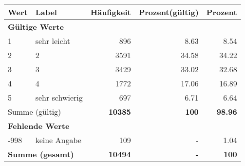     \begin{longtable}{lXrrr}
     \toprule
     \textbf{Wert} & \textbf{Label} & \textbf{Häufigkeit} & \textbf{Prozent(gültig)} & \textbf{Prozent} \\
     \endhead
     \midrule
     \multicolumn{5}{l}{\textbf{Gültige Werte}}\\

     1 &
     \multicolumn{1}{X}{ sehr leicht   } &


       \num{896} &
       \num[round-mode=places,round-precision=2]{8.63} &
         \num[round-mode=places,round-precision=2]{8.54} \\

     2 &
     \multicolumn{1}{X}{ 2   } &


       \num{3591} &
       \num[round-mode=places,round-precision=2]{34.58} &
         \num[round-mode=places,round-precision=2]{34.22} \\

     3 &
     \multicolumn{1}{X}{ 3   } &


       \num{3429} &
       \num[round-mode=places,round-precision=2]{33.02} &
         \num[round-mode=places,round-precision=2]{32.68} \\

     4 &
     \multicolumn{1}{X}{ 4   } &


       \num{1772} &
       \num[round-mode=places,round-precision=2]{17.06} &
         \num[round-mode=places,round-precision=2]{16.89} \\

     5 &
     \multicolumn{1}{X}{ sehr schwierig   } &


       \num{697} &
       \num[round-mode=places,round-precision=2]{6.71} &
         \num[round-mode=places,round-precision=2]{6.64} \\
     \midrule
     \multicolumn{2}{l}{Summe (gültig)} &
       \textbf{\num{10385}} &
     \textbf{\num{100}} &
       \textbf{\num[round-mode=places,round-precision=2]{98.96}} \\
     \multicolumn{5}{l}{\textbf{Fehlende Werte}}\\
       -998 &
       keine Angabe &
         \num{109} &
        - &
         \num[round-mode=places,round-precision=2]{1.04} \\
     \midrule
     \multicolumn{2}{l}{\textbf{Summe (gesamt)}} &
          \textbf{\num{10494}} &
        \textbf{-} &
        \textbf{\num{100}} \\
     \bottomrule
     \end{longtable}
     
